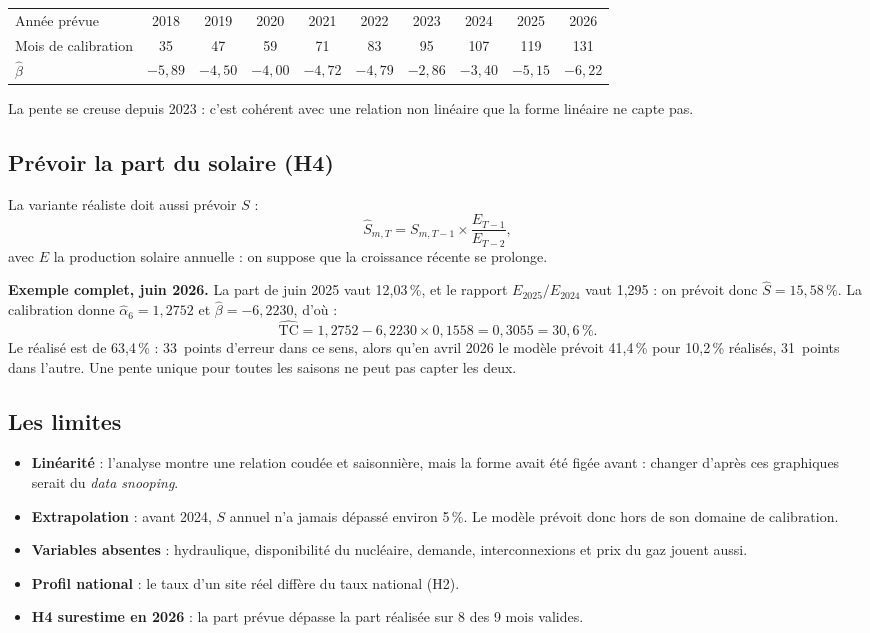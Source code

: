 \documentclass[11pt,a4paper]{article}
\newcommand{\TC}{\mathrm{TC}}
\begin{document}
\begin{center}
\small\setlength{\tabcolsep}{3.5pt}
\begin{tabular}{l*{9}{c}}
\toprule
Année prévue & 2018 & 2019 & 2020 & 2021 & 2022 & 2023 & 2024 & 2025 & 2026 \\
Mois de calibration & 35 & 47 & 59 & 71 & 83 & 95 & 107 & 119 & 131 \\
$\hat\beta$ & $-5{,}89$ & $-4{,}50$ & $-4{,}00$ & $-4{,}72$ & $-4{,}79$ & $-2{,}86$ & $-3{,}40$ & $-5{,}15$ & $-6{,}22$ \\
\bottomrule
\end{tabular}
\end{center}

La pente se creuse depuis 2023 : c'est cohérent avec une relation non linéaire que la forme linéaire ne capte pas.

\subsection{Prévoir la part du solaire (H4)}

La variante réaliste doit aussi prévoir $S$ :
\[
\hat S_{m,T} = S_{m,T-1} \times \frac{E_{T-1}}{E_{T-2}},
\]
avec $E$ la production solaire annuelle : on suppose que la croissance récente se prolonge.

\textbf{Exemple complet, juin 2026.} La part de juin 2025 vaut 12,03\,\%, et le rapport $E_{2025}/E_{2024}$ vaut 1,295 : on prévoit donc $\hat S = 15{,}58\,\%$. La calibration donne $\hat\alpha_6 = 1{,}2752$ et $\hat\beta = -6{,}2230$, d'où :
\[
\widehat{\TC} = 1{,}2752 - 6{,}2230 \times 0{,}1558 = 0{,}3055 = 30{,}6\,\%.
\]
Le réalisé est de 63,4\,\% : 33~points d'erreur dans ce sens, alors qu'en avril 2026 le modèle prévoit 41,4\,\% pour 10,2\,\% réalisés, 31~points dans l'autre. Une pente unique pour toutes
les saisons ne peut pas capter les deux.

\subsection{Les limites}

\begin{itemize}
\item \textbf{Linéarité} : l'analyse montre une relation coudée et saisonnière, mais la forme avait été figée avant : changer d'après ces graphiques serait du \emph{data snooping}.
\item \textbf{Extrapolation} : avant 2024, $S$ annuel n'a jamais dépassé environ 5\,\%. Le modèle prévoit donc hors de son domaine de calibration.
\item \textbf{Variables absentes} : hydraulique, disponibilité du nucléaire, demande, interconnexions et prix du gaz jouent aussi.
\item \textbf{Profil national} : le taux d'un site réel diffère du taux national (H2).
\item \textbf{H4 surestime en 2026} : la part prévue dépasse la part réalisée sur 8 des 9 mois valides.
\end{itemize}
\end{document}
